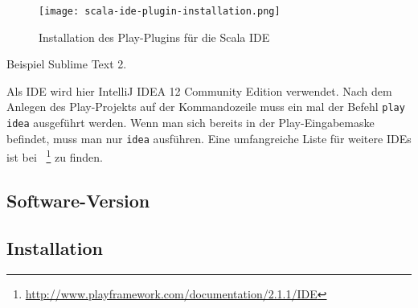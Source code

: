 \begin{figure}[h]
\centering
\texttt{[image: scala-ide-plugin-installation.png]}
\caption{Installation des Play-Plugins für die Scala IDE}
\label{fig:scala-ide-plugin-installation}
\end{figure}


Beispiel Sublime Text 2.

Als IDE wird hier IntelliJ IDEA 12 Community Edition verwendet.
Nach dem Anlegen des Play-Projekts auf der Kommandozeile muss ein mal der Befehl \lstinline|play idea| ausgeführt werden.
Wenn man sich bereits in der Play-Eingabemaske befindet, muss man nur \lstinline|idea| ausführen.
Eine umfangreiche Liste für weitere IDEs ist bei \citealt{ide}~\footnote{\url{http://www.playframework.com/documentation/2.1.1/IDE}} zu finden.




\subsection{Software-Version} %
\label{sub:software_version}



\subsection{Installation} %
\label{sub:installation}



